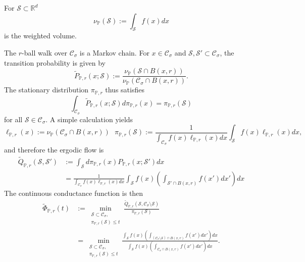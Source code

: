 \documentclass{article}
\newcommand{\Reals}{\mathbb{R}}
\newcommand{\Rd}{\Reals^d}
\newcommand{\1}{\mathbf{1}}
\newcommand{\Pbb}{\mathbb{P}}
\newcommand{\Sset}{\mathcal{S}}
\newcommand{\Cset}{\mathcal{C}}
\newcommand{\Csig}{\Cset_{\sigma}}
\theoremstyle{aldenthm}
\begin{document}
For $\Sset \subset \Rd$
\begin{equation*}
\nu_{\Pbb}(\Sset) := \int_{\Sset} f(x) dx
\end{equation*} 
is the weighted volume.

The $r$-ball walk over $\Csig$ is a Markov chain. For $x \in \Csig$ and $\Sset, \Sset' \subset \Csig$, the transition probability is given by
\begin{equation*}
\widetilde{P}_{\Pbb, r}(x;\Sset) := \frac{\nu_\Pbb(\Sset \cap B(x,r))}{\nu_\Pbb(\Csig \cap B(x,r))}.
\end{equation*}
The stationary distribution $\pi_{\Pbb,r}$ thus satisfies
\begin{equation*}
\int_{\Csig}  \widetilde{P}_{\Pbb, r}(x;\Sset) d\pi_{\Pbb,r}(x) = \pi_{\Pbb,r}(\Sset)
\end{equation*}
for all $\Sset \in \Csig$. A simple calculation yields 
\begin{equation*}
\ell_{\Pbb,r}(x) := \nu_\Pbb(\Csig \cap B(x,r)) ~~~ \pi_{\Pbb,r}(\Sset) := \frac{1}{\int_{\Csig} f(x) \ell_{\Pbb,r}(x) dx} \int_{\Sset} f(x) \ell_{\Pbb,r}(x) dx,
\end{equation*}
and therefore the ergodic flow is
\begin{align*}
\widetilde{Q}_{\Pbb, r}(\Sset, \Sset') & := \int_{\Sset} d\pi_{\Pbb,r}(x) P_{\Pbb, r}(x;\Sset') dx \\
& =  \frac{1}{\int_{\Csig} f(x) \ell_{\Pbb,r}(x) dx} \int_{\Sset} f(x) \left(\int_{\Sset' \cap B(x,r)} f(x') dx' \right) dx
\end{align*}
The continuous conductance function is then
\begin{align*}
\widetilde{\Phi}_{\Pbb,r}(t) & := \min_{\substack{\Sset \subset \Csig, \\ \pi_{\Pbb,r}(\Sset) \leq t} } \frac{\widetilde{Q}_{\Pbb,r}(\Sset, \Csig \setminus \Sset)}{\pi_{\Pbb,r}(\Sset)} \\
& = \min_{\substack{\Sset \subset \Csig, \\ \pi_{\Pbb,r}(\Sset) \leq t} } \frac{\int_{\Sset} f(x) \left(\int_{(\Csig \setminus \Sset) \cap B(x,r)} f(x') dx' \right) dx}{\int_{\Sset} f(x) \left(\int_{\Csig \cap B(x,r)} f(x') dx' \right) dx}.
\end{align*}
\end{document}
